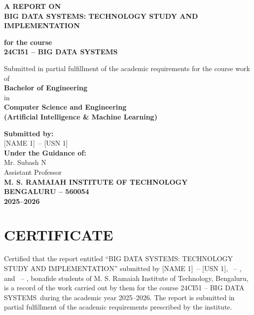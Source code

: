\documentclass[12pt,a4paper]{report}
\newcommand{\ProjectTitle}{BIG DATA SYSTEMS: TECHNOLOGY STUDY AND IMPLEMENTATION}
\newcommand{\CourseCode}{24CI51 -- BIG DATA SYSTEMS}
\newcommand{\AcademicYear}{2025--2026}
\newcommand{\StudentOne}{[NAME 1]}
\newcommand{\USNOne}{[USN 1]}
\newcommand{\GuideOne}{Mr. Subash N}
\newcommand{\GuideDesignation}{Assistant Professor}
\begin{document}
\begin{titlepage}
\centering
\thispagestyle{empty}

\vspace*{0.4cm}
{\bfseries\Large A REPORT ON\\[0.3cm]}
{\bfseries\LARGE \ProjectTitle\\[0.6cm]}

{\bfseries for the course\\[0.2cm]}
{\bfseries \CourseCode\\[0.8cm]}

Submitted in partial fulfillment of the academic requirements
for the course work of\\[0.2cm]
{\bfseries Bachelor of Engineering\\}
in\\
{\bfseries Computer Science and Engineering\\[0.2cm]}
{\bfseries (Artificial Intelligence \& Machine Learning)\\[0.8cm]}

{\bfseries Submitted by:\\[0.2cm]}
\StudentOne\ -- \USNOne\\
[0.8cm]

{\bfseries Under the Guidance of:\\[0.2cm]}
\GuideOne\\
\GuideDesignation\\[1.0cm]

{\bfseries M. S. RAMAIAH INSTITUTE OF TECHNOLOGY\\}
{\bfseries BENGALURU -- 560054\\}
{\bfseries \AcademicYear}

\end{titlepage}

\setcounter{page}{1}

\chapter*{CERTIFICATE}

Certified that the report entitled ``\ProjectTitle'' submitted by
\StudentOne\ -- \USNOne, \StudentTwo\ -- \USNTwo, and
\StudentThree\ -- \USNThree, bonafide students of M. S. Ramaiah
Institute of Technology, Bengaluru, is a record of the work carried
out by them for the course \CourseCode\ during the academic year
\AcademicYear. The report is submitted in partial fulfillment of the
academic requirements prescribed by the institute.
\end{document}
